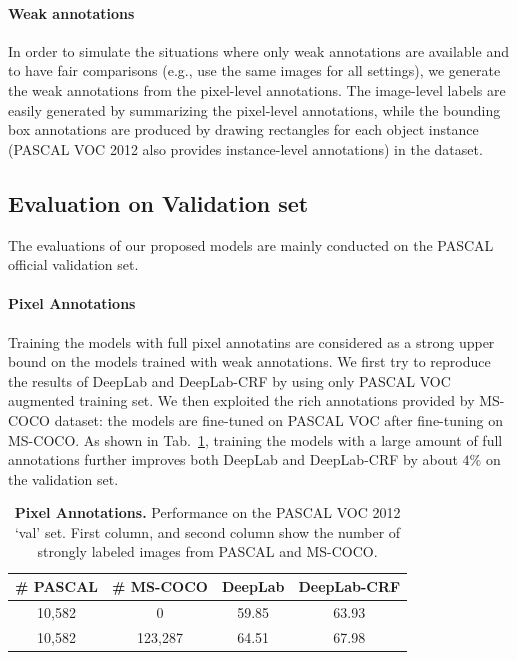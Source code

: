 \paragraph{Weak annotations} In order to simulate the situations where only weak annotations are available and to have fair comparisons (e.g., use the same images for all settings), we generate the weak annotations from the pixel-level annotations. The image-level labels are easily generated by summarizing the pixel-level annotations, while the bounding box annotations are produced by drawing rectangles for each object instance (PASCAL VOC 2012 also provides instance-level annotations) in the dataset.

\subsection{Evaluation on Validation set}
The evaluations of our proposed models are mainly conducted on the PASCAL official validation set. 

\paragraph{Pixel Annotations} Training the models with full pixel annotatins are considered as a strong upper bound on the models trained with weak annotations. We first try to reproduce the results of DeepLab and DeepLab-CRF \citep{chen2014semantic} by using only PASCAL VOC augmented training set. We then exploited the rich annotations provided by MS-COCO dataset: the models are fine-tuned on PASCAL VOC after fine-tuning on MS-COCO. As shown in Tab.~\ref{tb:pixel_annot}, training the models with a large amount of full annotations further improves both DeepLab and DeepLab-CRF by about $4\%$ on the validation set.

\begin{table}
  \centering
  \caption{{\bf{Pixel Annotations.}} Performance on the PASCAL VOC 2012 `val' set. First column, and second column show the number of strongly labeled images from PASCAL and MS-COCO. }
  \begin{tabular}{| c | c | c | c |}
    \hline
    \# PASCAL & \# MS-COCO & DeepLab & DeepLab-CRF \\
    \hline
    10,582 &   0     & 59.85 & 63.93  \\
    \hline
    10,582 & 123,287 & 64.51 & 67.98 \\
    \hline
    \end{tabular}
  \label{tb:pixel_annot}
\end{table}

